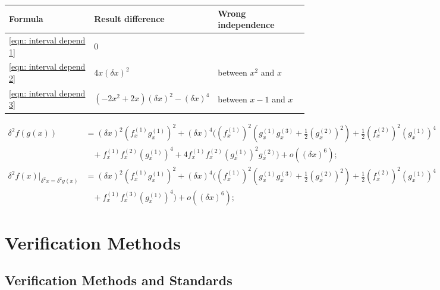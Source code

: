 \documentclass[twoside]{article}
\numberwithin{equation}{section}
\newcommand{\eqspace}{\;\;\;}
\begin{document}
\begin{table}
\label{eqn: dependency example}
\centering
\begin{tabular}{|l|l|l|} 
\hline 
Formula & Result difference & Wrong independence \\ 
\hline 
\eqref{eqn: interval depend 1} & $0$ & \\
\hline 
\eqref{eqn: interval depend 2} & $4 x (\delta x)^2$ & between $x^2$ and $x$ \\
\hline 
\eqref{eqn: interval depend 3} & $( - 2 x^2 + 2 x) (\delta x)^2 - (\delta x)^4$ & between $x-1$ and $x$ \\
\hline 
\end{tabular}
\end{table}

\begin{align}
\label{eqn: composite variance 1d}
\delta^2 f(g(x)) &= (\delta x)^2 (f^{(1)}_x g^{(1)}_x)^2 + (\delta x)^4
    ((f^{(1)}_x)^2 (g^{(1)}_x g^{(3)}_x + \frac{1}{2}(g^{(2)}_x)^2) + \frac{1}{2} (f^{(2)}_x)^2 (g^{(1)}_x)^4 \nonumber \\
  &\eqspace + f^{(1)}_x f^{(2)}_x (g^{(1)}_x)^4 + 4 f^{(1)}_x f^{(2)}_x (g^{(1)}_x)^2 g^{(2)}_x) + o((\delta x)^6); \\
\label{eqn: progressive variance}
\delta^2 f(x)|_{\delta^2 x = \delta^2 g(x)} &= (\delta x)^2 (f^{(1)}_x g^{(1)}_x)^2 + (\delta x)^4 
    ((f^{(1)}_x)^2 (g^{(1)}_x g^{(3)}_x + \frac{1}{2}(g^{(2)}_x)^2) + \frac{1}{2} (f^{(2)}_x)^2 (g^{(1)}_x)^4 \nonumber \\
  &\eqspace + f^{(1)}_x f^{(3)}_x (g^{(1)}_x)^4) + o((\delta x)^6) ; 
\end{align}



\clearpage
\section{Verification Methods}
\label{sec: validation}

\subsection{Verification Methods and Standards}
\end{document}
